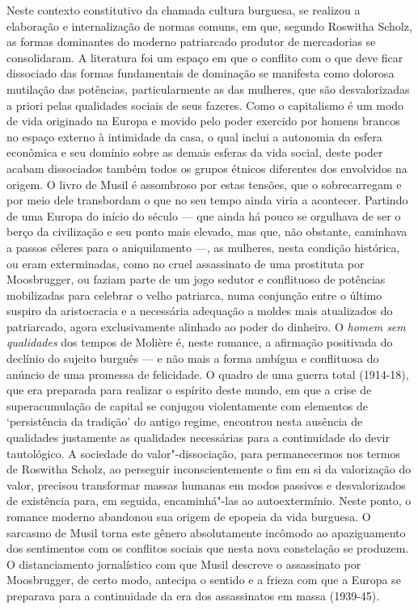 Neste contexto constitutivo da chamada cultura burguesa, se realizou a
elaboração e internalização de normas comuns, em que, segundo Roswitha
Scholz, as formas dominantes do moderno patriarcado produtor de
mercadorias se consolidaram. A literatura foi um espaço em que o
conflito com o que deve ficar dissociado das formas fundamentais de
dominação se manifesta como dolorosa mutilação das potências,
particularmente as das mulheres, que são desvalorizadas a priori pelas
qualidades sociais de seus fazeres. Como o capitalismo é um modo de vida
originado na Europa e movido pelo poder exercido por homens brancos no
espaço externo à intimidade da casa, o qual inclui a autonomia da esfera
econômica e seu domínio sobre as demais esferas da vida social, deste
poder acabam dissociados também todos os grupos étnicos diferentes dos
envolvidos na origem. O livro de Musil é assombroso por estas tensões,
que o sobrecarregam e por meio dele transbordam o que no seu tempo ainda
viria a acontecer. Partindo de uma Europa do início do século  --- que
ainda há pouco se orgulhava de ser o berço da civilização e seu ponto
mais elevado, mas que, não obstante, caminhava a passos céleres para o
aniquilamento ---, as mulheres, nesta condição histórica, ou eram
exterminadas, como no cruel assassinato de uma prostituta por
Moosbrugger, ou faziam parte de um jogo sedutor e conflituoso de
potências mobilizadas para celebrar o velho patriarca, numa conjunção
entre o último suspiro da aristocracia e a necessária adequação a moldes
mais atualizados do patriarcado, agora exclusivamente alinhado ao poder
do dinheiro. O \emph{homem sem qualidades} dos tempos de Molière é,
neste romance, a afirmação positivada do declínio do sujeito burguês ---
e não mais a forma ambígua e conflituosa do anúncio de uma promessa de
felicidade. O quadro de uma guerra total (1914-18), que era preparada
para realizar o espírito deste mundo, em que a crise de superacumulação
de capital se conjugou violentamente com elementos de `persistência da
tradição' do antigo regime, encontrou nesta ausência de qualidades
justamente as qualidades necessárias para a continuidade do devir
tautológico. A sociedade do valor"-dissociação, para permanecermos nos
termos de Roswitha Scholz, ao perseguir inconscientemente o fim em si da
valorização do valor, precisou transformar massas humanas em modos
passivos e desvalorizados de existência para, em seguida, encaminhá"-las
ao autoextermínio. Neste ponto, o romance moderno abandonou sua origem
de epopeia da vida burguesa. O sarcasmo de Musil torna este gênero
absolutamente incômodo ao apaziguamento dos sentimentos com os conflitos
sociais que nesta nova constelação se produzem. O distanciamento
jornalístico com que Musil descreve o assassinato por Moosbrugger, de
certo modo, antecipa o sentido e a frieza com que a Europa se preparava
para a continuidade da era dos assassinatos em massa (1939-45).

